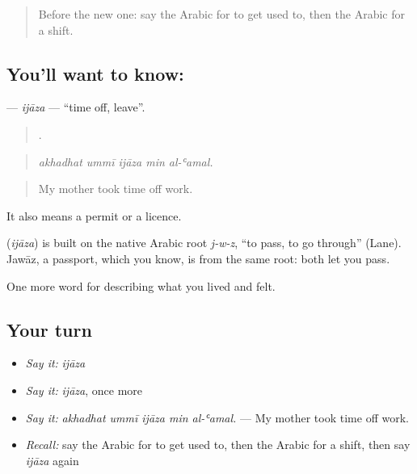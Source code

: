 \begin{quote}
Before the new one: say the Arabic for to get used to, then the Arabic for a shift.
\end{quote}

\subsection*{You'll want to know: }
\textbf{} — \emph{ijāza} — \textquotedblleft{}time off, leave\textquotedblright{}.

\begin{quote}
    .
\end{quote}

\begin{quote}
\emph{akhadhat ummī ijāza min al-ʿamal.}
\end{quote}

\begin{quote}
My mother took time off work.
\end{quote}

It also means a permit or a licence.

\begin{cousinweb}
\textbf{} (\emph{ijāza}) is built on the native Arabic root \emph{j-w-z}, \textquotedblleft{}to pass, to go through\textquotedblright{} (Lane). Jawāz, a passport, which you know, is from the same root: both let you pass.
\end{cousinweb}

\begin{grammarlens}[title={What you've built}]
One more word for describing what you lived and felt.
\end{grammarlens}

\subsection*{Your turn}
\begin{itemize}
\raggedright
  \item \emph{Say it:} \emph{ijāza}
  \item \emph{Say it:} \emph{ijāza}, once more
  \item \emph{Say it:} \emph{akhadhat ummī ijāza min al-ʿamal.} — My mother took time off work.
  \item \emph{Recall:} say the Arabic for to get used to, then the Arabic for a shift, then say \emph{ijāza} again
\end{itemize}

